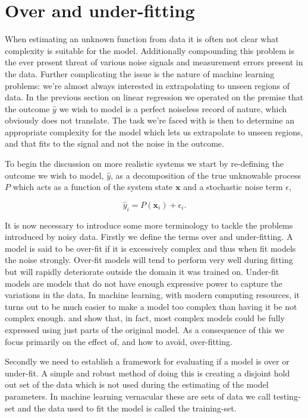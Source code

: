 \section{Over and under-fitting}\label{sec:fitting}

When estimating an unknown function from data it is often not clear what complexity is suitable for the model. Additionally compounding this problem is the ever present threat of various noise signals and measurement errors present in the data. Further complicating the issue is the nature of machine learning problems: we're almost always interested in extrapolating to unseen regions of data. In the previous section on linear regression we operated on the premise that the outcome $\hat{y}$ we wish to model is a perfect noiseless record of  nature, which obviously does not translate. The task we're faced with is then to determine an appropriate complexity for the model which lets us extrapolate to unseen regions, and that fits to the signal and not the noise in the outcome. 

To begin the discussion on more realistic systems we start by re-defining the outcome we wish to model, $\hat{y}$, as a decomposition of the true unknowable process $P$ which acts as a function of the system state $\mathbf{x}$ and a stochastic noise term $\epsilon$, 

\begin{equation}\label{eq:target}
\hat{y}_i = P(\mathbf{x}_i) + \epsilon_i.
\end{equation}

\noindent It is now necessary to introduce some more terminology to tackle the problems introduced by noisy data. Firstly we define the terms over and under-fitting. A model is said to be over-fit if it is excessively complex and thus when fit models the noise strongly. Over-fit models will tend to perform very well during fitting but will rapidly deteriorate outside the domain it was trained on. Under-fit models are models that do not have enough expressive power to capture the variations in the data. In machine learning, with modern computing resources, it turns out to be much easier to make a model too complex than having it be not complex enough. \citet{Frankle2019} and \citet{Frankle2018} show that, in fact, most complex models could be fully expressed using just parts of the original model. As a consequence of this we focus primarily on the effect of, and how to avoid, over-fitting.

Secondly we need to establish a framework for evaluating if a model is over or under-fit. A simple and robust method of doing this is creating a disjoint hold out set of the data which is not used during the estimating of the model parameters. In machine learning vernacular these are sets of data we call testing-set and the data used to fit the model is called the training-set. 

